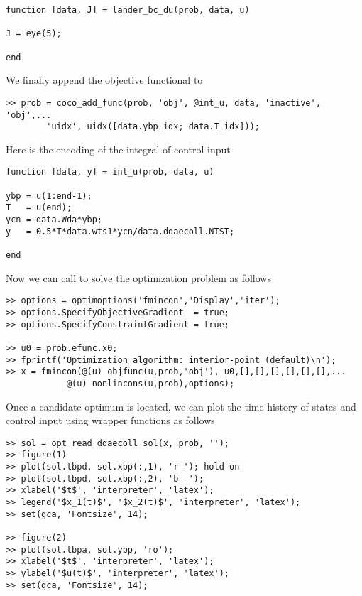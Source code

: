 \begin{lstlisting}[language=coco-highlight]
function [data, J] = lander_bc_du(prob, data, u)

J = eye(5);

end
\end{lstlisting}
We finally append the objective functional to 
\begin{lstlisting}[language=coco-highlight]
>> prob = coco_add_func(prob, 'obj', @int_u, data, 'inactive', 'obj',...
        'uidx', uidx([data.ybp_idx; data.T_idx]));
\end{lstlisting}
Here  is the encoding of the integral of control input
\begin{lstlisting}[language=coco-highlight]
function [data, y] = int_u(prob, data, u) 

ybp = u(1:end-1);
T   = u(end);
ycn = data.Wda*ybp;
y   = 0.5*T*data.wts1*ycn/data.ddaecoll.NTST;

end
\end{lstlisting}

Now we can call  to solve the optimization problem as follows
\begin{lstlisting}[language=coco-highlight]
>> options = optimoptions('fmincon','Display','iter');  
>> options.SpecifyObjectiveGradient  = true;
>> options.SpecifyConstraintGradient = true;

>> u0 = prob.efunc.x0;
>> fprintf('Optimization algorithm: interior-point (default)\n');
>> x = fmincon(@(u) objfunc(u,prob,'obj'), u0,[],[],[],[],[],[],...
    		@(u) nonlincons(u,prob),options);
\end{lstlisting}

Once a candidate optimum is located, we can plot the time-history of states and control input using wrapper functions as follows
\begin{lstlisting}[language=coco-highlight]
>> sol = opt_read_ddaecoll_sol(x, prob, '');
>> figure(1)
>> plot(sol.tbpd, sol.xbp(:,1), 'r-'); hold on
>> plot(sol.tbpd, sol.xbp(:,2), 'b--');
>> xlabel('$t$', 'interpreter', 'latex');
>> legend('$x_1(t)$', '$x_2(t)$', 'interpreter', 'latex');
>> set(gca, 'Fontsize', 14);

>> figure(2)
>> plot(sol.tbpa, sol.ybp, 'ro');
>> xlabel('$t$', 'interpreter', 'latex');
>> ylabel('$u(t)$', 'interpreter', 'latex');
>> set(gca, 'Fontsize', 14);
\end{lstlisting}

